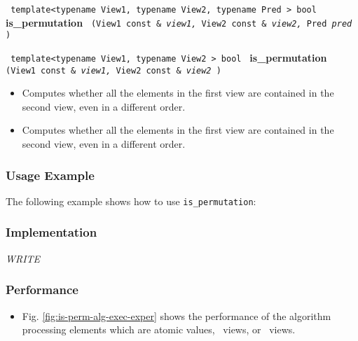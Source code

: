 \noindent
\texttt{%
template<typename View1, typename View2, typename Pred >
\newline
bool 
}
\newline
\textbf{is\_permutation}%
\texttt{%
(View1 const \&
\textit{view1,}%
View2 const \&
\textit{view2,}%
Pred 
\textit{pred}%
)
}
\vspace{0.4cm}

\noindent
\texttt{%
template<typename View1, typename View2 >
\newline
bool 
}
\newline
\textbf{is\_permutation}%
\texttt{%
(View1 const \&
\textit{view1,}%
View2 const \&
\textit{view2}%
)
}

\begin{itemize}
\item
Computes whether all the elements in the first view are contained in the second view, even in a different order. 
\item
Computes whether all the elements in the first view are contained in the second view, even in a different order. 
\end{itemize}

\subsubsection{Usage Example} %

The following example shows how to use \texttt{is\_permutation}:

 
\subsubsection{Implementation} %

\textit{WRITE}

\subsubsection{Performance} %

\begin{itemize}
\item
Fig. \ref{fig:is-perm-alg-exec-exper}
shows the performance of the algorithm processing
elements which are atomic values, \stl\ views, or \stapl\ views.
\end{itemize}

